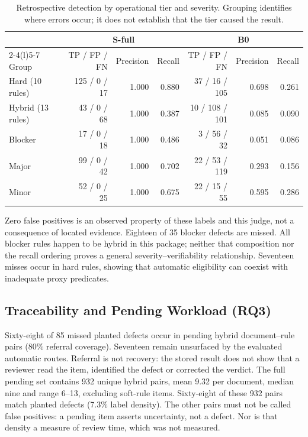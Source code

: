 \begin{table}[!ht]
\caption{Retrospective detection by operational tier and severity. Grouping identifies where errors occur; it does not establish that the tier caused the result.}
\label{tab:tiers-results}
\centering\footnotesize
\begin{tabular}{@{}lrrrrrr@{}}
\toprule
& \multicolumn{3}{c}{S-full} & \multicolumn{3}{c}{B0} \\
\cmidrule(lr){2-4}\cmidrule(l){5-7}
Group & TP / FP / FN & Precision & Recall & TP / FP / FN & Precision & Recall \\
\midrule
Hard (10 rules) & 125 / 0 / 17 & 1.000 & 0.880 & 37 / 16 / 105 & 0.698 & 0.261 \\
Hybrid (13 rules) & 43 / 0 / 68 & 1.000 & 0.387 & 10 / 108 / 101 & 0.085 & 0.090 \\
\midrule
Blocker & 17 / 0 / 18 & 1.000 & 0.486 & 3 / 56 / 32 & 0.051 & 0.086 \\
Major & 99 / 0 / 42 & 1.000 & 0.702 & 22 / 53 / 119 & 0.293 & 0.156 \\
Minor & 52 / 0 / 25 & 1.000 & 0.675 & 22 / 15 / 55 & 0.595 & 0.286 \\
\bottomrule
\end{tabular}
\end{table}

Zero false positives is an observed property of these labels and this judge, not a consequence of located evidence. Eighteen of 35 blocker defects are missed. All blocker rules happen to be hybrid in this package; neither that composition nor the recall ordering proves a general severity--verifiability relationship. Seventeen misses occur in hard rules, showing that automatic eligibility can coexist with inadequate proxy predicates.

\subsection{Traceability and Pending Workload (RQ3)}\label{sec:misses}

Sixty-eight of 85 missed planted defects occur in pending hybrid document--rule pairs (80\% referral coverage). Seventeen remain unsurfaced by the evaluated automatic routes. Referral is not recovery: the stored result does not show that a reviewer read the item, identified the defect or corrected the verdict. The full pending set contains 932 unique hybrid pairs, mean 9.32 per document, median nine and range 6--13, excluding soft-rule items. Sixty-eight of these 932 pairs match planted defects (7.3\% label density). The other pairs must not be called false positives: a pending item asserts uncertainty, not a defect. Nor is that density a measure of review time, which was not measured.

